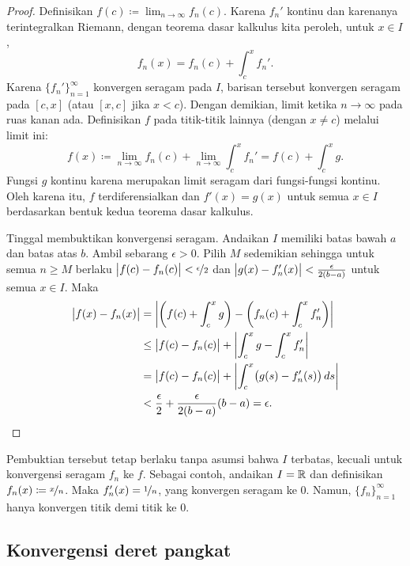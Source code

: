 \begin{proof}
Definisikan $f(c) \coloneqq \lim_{n\to \infty} f_n(c)$.
Karena $f_n'$ kontinu dan karenanya terintegralkan Riemann,
dengan teorema dasar kalkulus kita peroleh, untuk $x \in I$,
\begin{equation*}
f_n(x) = f_n(c) + \int_c^x f_n' .
\end{equation*}
Karena $\{ f_n' \}_{n=1}^\infty$ konvergen seragam pada $I$, barisan tersebut konvergen seragam
pada $[c,x]$ (atau $[x,c]$ jika $x < c$).
Dengan demikian, limit ketika $n \to \infty$ pada ruas kanan ada.
Definisikan $f$ pada titik-titik lainnya (dengan $x\neq c$) melalui limit ini:
\begin{equation*}
f(x) \coloneqq
\lim_{n\to\infty} f_n(c) + \lim_{n\to\infty} \int_c^x f_n'
=
f(c) + \int_c^x g .
\end{equation*}
Fungsi $g$ kontinu karena merupakan limit seragam dari fungsi-fungsi
kontinu.  Oleh karena itu, $f$ terdiferensialkan dan $f'(x) = g(x)$ untuk semua $x \in I$
berdasarkan bentuk kedua teorema dasar kalkulus.

Tinggal membuktikan
konvergensi seragam.
Andaikan $I$ memiliki batas bawah $a$ dan batas atas $b$.
Ambil sebarang $\epsilon > 0$.  Pilih $M$
sedemikian sehingga untuk semua $n \geq M$ berlaku
$\bigl\lvert {f(c)-f_n(c)} \bigr\rvert < \nicefrac{\epsilon}{2}$
dan
$\bigl\lvert {g(x)-f_n'(x)} \bigr\rvert < \frac{\epsilon}{2(b-a)}$
untuk semua $x \in I$.  Maka
\begin{equation*}
\begin{split}
\bigl\lvert {f(x) - f_n(x)} \bigr\rvert & =
\left\lvert {\left(f(c) + \int_c^x g\right) - \left( f_n(c) + \int_c^x f_n' \right)} \right\rvert
\\
& \leq
\bigl\lvert {f(c) - f_n(c)} \bigr\rvert + \left\lvert {\int_c^x g - \int_c^x f_n'} \right\rvert
\\
& =
\bigl\lvert {f(c) - f_n(c)} \bigr\rvert + \left\lvert {\int_c^x \bigl(g(s) - f_n'(s)\bigr) \, ds} \right\rvert
\\
& <
\frac{\epsilon}{2}
+
\frac{\epsilon}{2(b-a)}
(b-a)
=\epsilon. \qedhere
\end{split}
\end{equation*}
\end{proof}

Pembuktian tersebut tetap berlaku tanpa asumsi bahwa $I$ terbatas, kecuali untuk
konvergensi seragam $f_n$ ke $f$.  Sebagai contoh, andaikan $I = {\mathbb{R}}$ dan definisikan
$f_n(x) \coloneqq \nicefrac{x}{n}$.  Maka $f_n'(x)=\nicefrac{1}{n}$, yang
konvergen seragam ke $0$.  Namun, $\{f_n\}_{n=1}^\infty$ hanya konvergen titik demi titik ke 0.

\subsection{Konvergensi deret pangkat}

